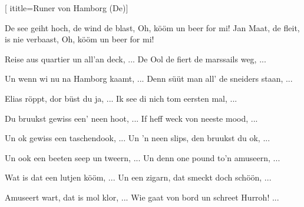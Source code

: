 [
ititle={Runer von Hamborg (De)}]


\beginverse
De see geiht hoch, de wind de blast,
Oh, kööm un beer for mi!
Jan Maat, de fleit, is nie verbaast,
Oh, kööm un beer for mi!
\endverse

\beginverse
Reise aus quartier un all'an deck, ...
De Ool de fiert de marssails weg, ...
\endverse

\beginverse
Un wenn wi nu na Hamborg kaamt, ...
Denn süüt man all' de sneiders staan, ...
\endverse

\beginverse
Elias röppt, dor büst du ja, ...
Ik see di nich tom eersten mal, ...
\endverse

\beginverse
Du bruukst gewiss een' neen hoot, ...
If heff weck von neeste mood, ...
\endverse

\beginverse
Un ok gewiss een taschendook, ...
Un 'n neen slips, den bruukst du ok, ...
\endverse

\beginverse
Un ook een beeten seep un tweern, ...
Un denn one pound to'n amuseern, ...
\endverse

\beginverse
Wat is dat een lutjen kööm, ...
Un een zigarn, dat smeckt doch schöön, ...
\endverse

\beginverse
Amuseert wart, dat is mol klor, ...
Wie gaat von bord un schreet Hurroh! ...
\endverse
\endsong
